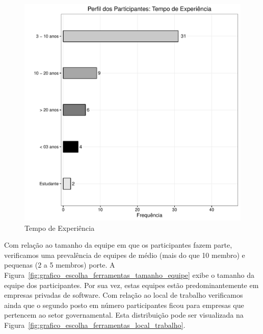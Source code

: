 \begin{figure}[htpb]
	\centering
	\includegraphics[width=0.8\linewidth]{./chapter-estudo-funcionalidades-fgrm/img/grafico_escolha_ferramentas_tempo_experiencia.pdf}
	\caption{Tempo de Experiência}
\label{fig:grafico_escolha_ferramentas_tempo_experiencia}
\end{figure}

Com relação ao tamanho da equipe em que os participantes fazem parte,
verificamos uma prevalência de equipes de médio (mais do que 10 membro) e
pequenas (2 a 5 membros) porte. A
Figura~\ref{fig:grafico_escolha_ferramentas_tamanho_equipe} exibe o tamanho da
equipe dos participantes. Por sua vez, estas equipes estão predominantemente em
empresas privadas de software. Com relação ao local de trabalho verificamos
ainda que o segundo posto em número par\-ti\-ci\-pan\-tes ficou para empresas
que pertencem ao setor governamental. Esta distribuição pode ser visualizada na
Figura~\ref{fig:grafico_escolha_ferramentas_local_trabalho}.

